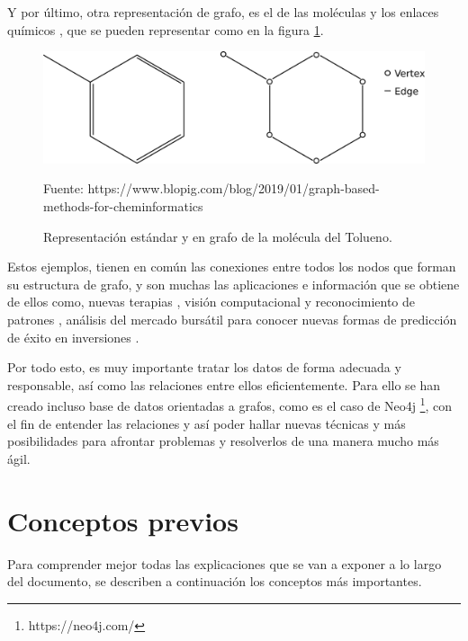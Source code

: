 Y por último, otra representación de grafo, es el de las moléculas y los enlaces químicos \cite{grafo-molecula}, que se pueden representar como en la figura \ref{fig:molecula-graph}.

 \begin{figure}[H]
	\centering
	\includegraphics[scale=0.3]{Figures/molecula-graph.pdf}
	\caption{Representación estándar y en grafo de la molécula del Tolueno.}
	\scriptsize Fuente: https://www.blopig.com/blog/2019/01/graph-based-methods-for-cheminformatics
	\label{fig:molecula-graph}
\end{figure}

Estos ejemplos, tienen en común las conexiones entre todos los nodos que forman su estructura de grafo, y son muchas las aplicaciones e información que se obtiene de ellos como, nuevas terapias \cite{top-molec}, visión computacional y reconocimiento de patrones \cite{mcp-compVision}, análisis del mercado bursátil para conocer nuevas formas de predicción de éxito en inversiones \cite{vid-graf-ai}.

Por todo esto, es muy importante tratar los datos de forma adecuada y responsable, así como las relaciones entre ellos eficientemente. Para ello se han creado incluso base de datos orientadas a grafos, como es el caso de Neo4j \footnote{https://neo4j.com/}, con el fin de entender las relaciones y así poder hallar nuevas técnicas y más posibilidades para afrontar problemas y resolverlos de una manera mucho más ágil.


\section{Conceptos previos}
Para comprender mejor todas las explicaciones que se van a exponer a lo largo del documento, se describen a continuación los conceptos más importantes.

